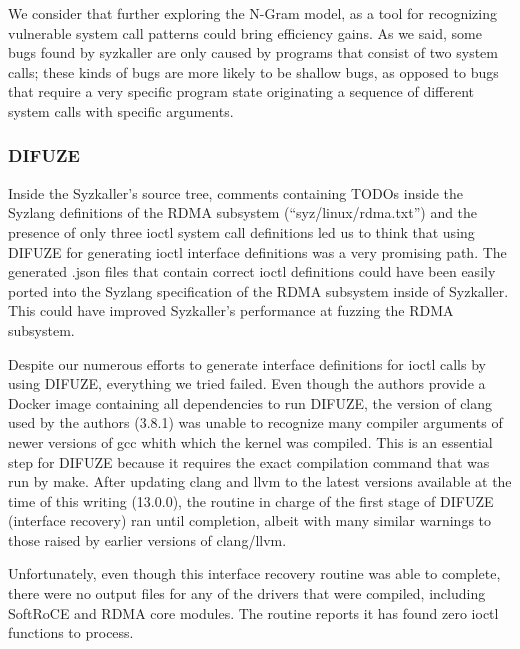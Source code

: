 We consider that further exploring the N-Gram model, as a tool for recognizing vulnerable system call patterns could bring
efficiency gains. As we said, some bugs found by syzkaller are only caused by programs that consist of two system calls;
these kinds of bugs are more likely to be shallow bugs, as opposed to bugs that require a very specific program state
originating a sequence of different system calls with specific arguments.


\subsubsection{DIFUZE}\label{ss:disc-difuze}

Inside the Syzkaller's source tree, comments containing TODOs inside the Syzlang definitions of the RDMA subsystem (``syz/linux/rdma.txt'') and
the presence of only three ioctl system call definitions led us to think that using DIFUZE for generating ioctl interface definitions
was a very promising path. The generated .json files that contain correct ioctl definitions could have been easily ported into the
Syzlang specification of the RDMA subsystem inside of Syzkaller. This could have improved Syzkaller's performance at fuzzing
the RDMA subsystem.

Despite our numerous efforts to generate interface definitions for ioctl calls by using DIFUZE,
everything we tried failed. Even though the authors provide a Docker image containing all dependencies
to run DIFUZE, the version of clang used by the authors (3.8.1) was unable to recognize
many compiler arguments of newer versions of gcc whith which the kernel was compiled. This is an essential step
for DIFUZE because it requires the exact compilation command that was run by make.
After updating clang and llvm to the latest versions available at the time of this writing (13.0.0), the routine in charge of
the first stage of DIFUZE (interface recovery) ran until completion, albeit with many similar warnings
to those raised by earlier versions of clang/llvm.

Unfortunately, even though this interface recovery routine
was able to complete, there were no output files for any of the drivers that were compiled, including SoftRoCE and
RDMA core modules. The routine reports it has found zero ioctl functions to process.

